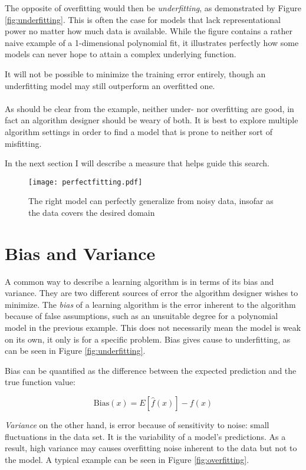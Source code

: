 The opposite of overfitting would then be \textit{underfitting},
as demonstrated by Figure \ref{fig:underfitting}.
This is often the case for models that lack
representational power
no matter how much data is available.
While the figure contains a rather naive example
of a 1-dimensional polynomial fit,
it illustrates perfectly how some models
can never hope to attain a complex underlying function.

It will not be possible to minimize the training error entirely,
though an underfitting model may still outperform
an overfitted one.

\paragraph{}
As should be clear from the example,
neither under- nor overfitting are good,
in fact an algorithm designer
should be weary of both.
It is best to explore multiple
algorithm settings in order to find
a model that is prone to
neither sort of misfitting.

In the next section I will describe a measure
that helps guide this search.

\begin{figure}[h]
\center
\texttt{[image: perfectfitting.pdf]}
\label{fig:perfectfitting}
\caption{The right model can perfectly generalize from noisy data,
insofar as the data covers the desired domain}
\end{figure}

\section{Bias and Variance}
A common way to describe a learning algorithm
is in terms of its
bias and variance.
They are two different sources of error
the algorithm designer wishes to minimize.
The \textit{bias} of a learning algorithm
is the error inherent to the algorithm
because of false assumptions,
such as an unsuitable degree for a polynomial model
in the previous example.
This does not necessarily mean the model is weak on its own,
it only is for a specific problem.
Bias gives cause to underfitting,
as can be seen in Figure \ref{fig:underfitting}.

Bias can be quantified as the difference
between the expected prediction
and the true function value:

$$
\text{Bias}(x) = E[\hat{f} (x)] - f(x)
$$

\textit{Variance}
on the other hand,
is error because of sensitivity to noise:
small fluctuations in the data set.
It is the variability of a model's predictions.
As a result,
high variance may causes overfitting
noise inherent to the data but not to the model.
A typical example can be seen in Figure \ref{fig:overfitting}.

